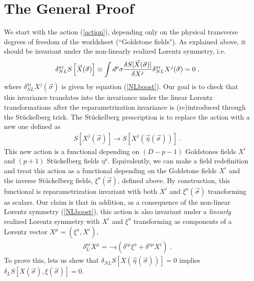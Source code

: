 \documentclass[%
 reprint,
 amsmath,amssymb,
 aps,
]{revtex4-1}
\begin{document}
\section{The General Proof}

We start with  the action (\ref{action}), depending
only on the physical transverse degrees of freedom of the worldsheet (``Goldstone fields").
As explained above, it should be invariant under the non-linearly realized Lorentz symmetry, i.e.
\begin{eqnarray}
    \delta^{a i}_{NL} S \left[ \vec{X}(\vec{\sigma}) \right]
    \equiv \int d^p \sigma
 {\delta S[ \vec{X}(\vec{\sigma}) ]\over \delta X^j}
        \delta^{a i}_{NL} X^j(\vec{\sigma}) \nonumber = 0 \; , \nonumber
\end{eqnarray}
where $\delta^{ai}_{NL} X^j(\vec{\sigma})$ is given by equation (\ref{NLboost}).
Our goal is to check that this invariance translates into the invariance under the linear Lorentz transformations after the
reparametrization invariance is (re)introduced through the St\"uckelberg trick.
The  St\"uckelberg prescription is to replace the action with a new
one defined as
\begin{eqnarray}
    S[X^j(\vec{\sigma})] \rightarrow S[X^j(\vec{\eta}(\vec{\sigma}))] \; . \nonumber
\end{eqnarray}
This new action is a functional depending on $(D-p-1)$ Goldstones fields $X^i$ and $(p+1)$ St\"uckelberg fields $\eta^a$.
Equivalently, we can make a field redefinition and treat  this action as a functional depending on  the Goldstone fields $X^i$ and
the inverse St\"uckelberg fields, $\xi^a(\vec{\sigma})$, defined above. By construction, this functional is reparametrization invariant with
both $X^i$ and $\xi^a(\vec{\sigma})$ transforming as scalars.
 Our claim is that in addition, as a consequence of the non-linear Lorentz symmetry (\ref{NLboost}), this action is also invariant under a {\it linearly} realized
 Lorentz symmetry with $X^i$ and $\xi^a$ transforming as components of a Lorentz vector $X^\mu=(\xi^a, X^i)$,
\begin{eqnarray}
\label{linearvar}
    \delta_{L}^{ai} X^{\mu} = -\epsilon (\delta^{i \mu} \xi^a + \delta^{a \mu} X^i) \; .
\end{eqnarray}
To prove this, lets us  show  that
$\delta_{NL} S[X(\vec{\eta}(\vec{\sigma}))] = 0$ implies $\delta_{L} S[X(\vec{\sigma}),\xi(\vec{\sigma})] = 0$.
\end{document}
